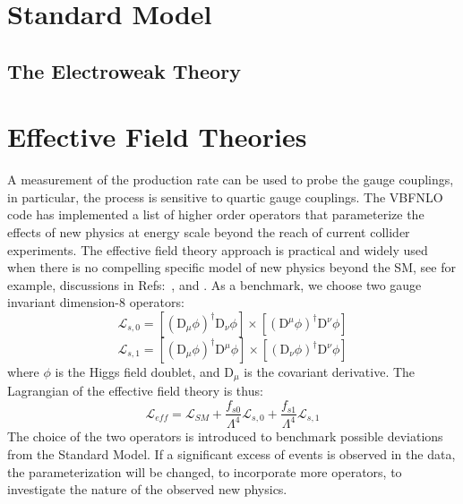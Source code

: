 \section{Standard Model}
\subsection{The Electroweak Theory}
\section{Effective Field Theories}

A measurement
of the production rate can be used to probe the gauge couplings, in
particular, the process is sensitive to quartic gauge couplings. The
{\sc VBFNLO } code has implemented a list of higher order operators
that parameterize the effects of new physics at energy scale beyond
the reach of current collider experiments.  The effective field theory
approach is practical and widely used when there is no compelling
specific model of new physics beyond the SM, see for example,
discussions in Refs:~\cite{Hagiwara:1993ck}, \cite{Buchmuller:1985jz}
and \cite{Eboli:2006wa}.  As a benchmark, we choose two gauge
invariant dimension-8 operators:
\begin{equation}
\mathcal{L}_{s,0} = [(\mathrm{D}_\mu\phi)^\dag\mathrm{D}_\nu \phi]\times [(\mathrm{D}^\mu\phi)^\dag\mathrm{D}^\nu \phi]
\end{equation}
\begin{equation}
\mathcal{L}_{s,1} = [(\mathrm{D}_\mu\phi)^\dag\mathrm{D}^\mu \phi]\times [(\mathrm{D}_\nu\phi)^\dag\mathrm{D}^\nu \phi]
\end{equation}
where $\phi$ is the Higgs field doublet, and $\mathrm{D}_\mu$ is the covariant derivative. 
The Lagrangian of the effective field theory is thus: 
\begin{equation}
\mathcal{L}_{eff} = \mathcal{L}_{SM} + \frac{f_{s0}}{\Lambda^4}\mathcal{L}_{s,0}+\frac{f_{s1}}{\Lambda^4}\mathcal{L}_{s,1}
\end{equation}
The choice of the two operators is introduced to benchmark possible
deviations from the Standard Model. If a significant excess of events is 
observed in the data, the parameterization will be changed, to incorporate 
more operators, to
investigate the nature of the observed new physics.




